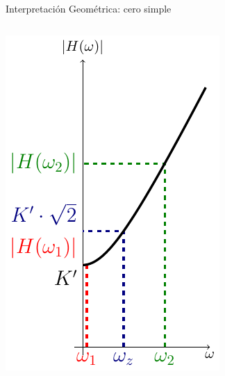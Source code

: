 \documentclass[xcolor={usenames,svgnames,dvipsnames}]{beamer}
\begin{document}
\begin{frame}[label={sec:org0127f75}]{Interpretación Geométrica: cero simple}
\begin{columns}
\begin{column}{0.5\columnwidth}
\begin{center}
\includegraphics[width=.9\linewidth]{figs/CeroGeometricaPlot.pdf}
\end{center}
\end{column}
\end{columns}
\end{frame}
\end{document}
